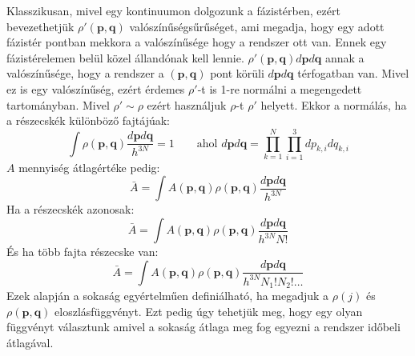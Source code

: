 \documentclass[../main.tex]{subfiles}
\begin{document}
Klasszikusan, mivel egy kontinuumon dolgozunk a fázistérben, ezért bevezethetjük $\rho'(\mathbf{p}, \mathbf{q})$ valószínűségsűrűséget, ami megadja, hogy egy adott fázistér pontban mekkora a valószínűsége
hogy a rendszer ott van. Ennek egy fázistérelemen belül közel állandónak kell lennie. $\rho'(\mathbf{p}, \mathbf{q})d\mathbf{p} d\mathbf{q}$ annak a valószínűsége, hogy a rendszer a $(\mathbf{p}, \mathbf{q})$ pont körüli $d\mathbf{p} d\mathbf{q}$ térfogatban van.
Mivel ez is egy valószínűség, ezért érdemes $\rho'$-t is 1-re normálni a megengedett tartományban. Mivel $\rho' \sim \rho$ ezért használjuk $\rho$-t $\rho'$ helyett. Ekkor a normálás, ha a részecskék különböző fajtájúak:
\begin{equation}
    \int \rho(\mathbf{p}, \mathbf{q}) \frac{d\mathbf{p} d\mathbf{q}}{h^{3N}} = 1 \qquad \text{ahol }d\mathbf{p} d\mathbf{q} = \prod_{k=1}^{N} \prod_{i=1}^{3} dp_{k,i} dq_{k,i}
\end{equation}
$A$ mennyiség átlagértéke pedig:
\begin{equation}
    \bar{A} = \int A(\mathbf{p}, \mathbf{q}) \rho(\mathbf{p}, \mathbf{q}) \frac{d\mathbf{p} d\mathbf{q}}{h^{3N}}
\end{equation}
Ha a részecskék azonosak:
\begin{equation}
   \bar{A} =  \int A(\mathbf{p}, \mathbf{q}) \rho(\mathbf{p}, \mathbf{q}) \frac{d\mathbf{p} d\mathbf{q}}{h^{3N} N!}
\end{equation}
És ha több fajta részecske van:
\begin{equation}
   \bar{A} =  \int A(\mathbf{p}, \mathbf{q}) \rho(\mathbf{p}, \mathbf{q}) \frac{d\mathbf{p} d\mathbf{q}}{h^{3N} N_1! N_2! \ldots}
\end{equation}
Ezek alapján a sokaság egyértelműen definiálható, ha megadjuk a $\rho(j)$ és $\rho(\mathbf{p}, \mathbf{q})$ eloszlásfüggvényt. Ezt pedig úgy tehetjük meg, hogy egy olyan függvényt választunk
amivel a sokaság átlaga meg fog egyezni a rendszer időbeli átlagával.
\end{document}
